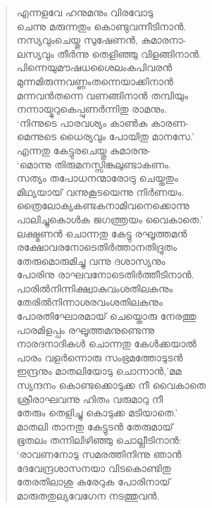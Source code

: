 \begin{verse}
എന്നളവേ ഹനുമനും വിരവോടു\\
ചെന്നു മരുന്നതും കൊണ്ടുവന്നീടിനാന്‍.\\
നസ്യവുംചെയ്തു സുഷേണന്‍, കുമാരനാ-\\
ലസ്യവും തീര്‍ന്നു തെളിഞ്ഞു വിളങ്ങിനാന്‍.\\
പിന്നെയുമൗഷധശൈലംകപിവരന്‍\\
മുന്നമിരുന്നവണ്ണംതന്നെയാക്കിനാന്‍\\
മന്നവന്‍തന്നെ വണങ്ങിനാന്‍ തമ്പിയും\\
നന്നായ്മുറുകെപ്പുണര്‍ന്നിതു രാമനും.\\
‘നിന്നുടെ പാരവശ്യം കാണ്‍ക കാരണ-\\
മെന്നുടെ ധൈര്യവും പോയിതു മാനസേ.’\\
എന്നതു കേട്ടുരചെയ്തു കുമാരനു-\\
‘മൊന്നു തിരുമനസ്സിങ്കലുണ്ടാകണം.\\
സത്യം തപോധനന്മാരോട്രു ചെയ്തതും\\
മിഥ്യയായ് വന്നുകൂടയെന്നു നിര്‍ണയം.\\
ത്രൈലോക്യകണ്ടകനാമിവനെക്കൊന്നു\\
പാലിച്ചുകൊള്‍ക ജഗത്ത്രയം വൈകാതെ.’\\
ലക്ഷ്മണന്‍ ചൊന്നതു കേട്ടു രഘൂത്തമന്‍\\
രക്ഷോവരനോടെതിര്‍ത്താനതിദ്രുതം\\
തേരുമൊരുമിച്ചു വന്നു ദശാസ്യനും\\
പോരിനു രാഘവനോടെതിര്‍ത്തീടിനാന്‍.\\
പാരില്‍നിന്നിക്ഷ്വാകുവംശതിലകനും\\
തേരില്‍നിന്നാശരവംശതിലകനും\\
പോരതിഘോരമായ് ചെയ്തൊരു നേരത്തു\\
പാരമിളപ്പം രഘൂത്തമനുണ്ടെന്നു\\
നാരദനാദികള്‍ ചൊന്നതു കേള്‍ക്കയാല്‍\\
പാരം വളര്‍ന്നൊരു സംഭ്രമത്തോടുടന്‍\\
ഇന്ദ്രനും മാതലിയോടു ചൊന്നാന്‍,’മമ\\
സ്യന്ദനം കൊണ്ടക്കൊടുക്ക നീ വൈകാതെ\\
ശ്രീരാഘവന്നു ഹിതം വരുമാറു നീ\\
തേരും തെളിച്ചു കൊടുക്ക മടിയാതെ.’\\
മാതലി താനതു കേട്ടുടന്‍ തേരുമായ്\\
ഭൂതലം തന്നിലിഴിഞ്ഞു ചൊല്ലീടിനാന്‍:\\
‘രാവണനോടു സമരത്തിനിന്നു ഞാന്‍\\
ദേവേന്ദ്രശാസനയാ വിടകൊണ്ടിതു\\
തേരതിലാശു കരേറുക പോരിനായ്\\
മാരുതതുല്യവേഗേന നടത്തുവന്‍.\\

\end{verse}
